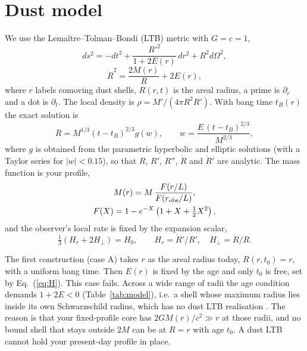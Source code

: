 \documentclass[10pt,twocolumn,letterpaper]{article}
\begin{document}
\section{Dust model}
We use the Lema\^itre--Tolman--Bondi (LTB) metric \cite{Bondi1947,Bolejko2011} with $G=c=1$,
\begin{equation}\label{eq:ltb}
ds^2=-dt^2+\frac{R'^2}{1+2E(r)}\,dr^2+R^2d\Omega^2,
\end{equation}
\begin{equation}\label{eq:fried}
\dot R^2=\frac{2M(r)}{R}+2E(r),
\end{equation}
where $r$ labels comoving dust shells, $R(r,t)$ is the areal radius, a prime is $\partial_r$ and a dot is $\partial_t$. The local density is $\rho=M'/(4\pi R^2R')$. With bang time $t_B(r)$ the exact solution is
\begin{equation}\label{eq:sol}
R=M^{1/3}(t-t_B)^{2/3}g(w),\qquad w=\frac{E\,(t-t_B)^{2/3}}{M^{2/3}},
\end{equation}
where $g$ is obtained from the parametric hyperbolic and elliptic solutions (with a Taylor series for $|w|<0.15$), so that $R$, $R'$, $R''$, $\dot R$ and $\dot R'$ are analytic. The mass function is your profile,
\begin{equation}\label{eq:M}
\begin{gathered}
M(r)=M\,\frac{F(r/L)}{F(r_{\rm obs}/L)},\\ F(X)=1-e^{-X}\left(1+X+\tfrac12X^2\right),
\end{gathered}
\end{equation}
and the observer's local rate is fixed by the expansion scalar,
\begin{equation}\label{eq:H}
\tfrac13\left(H_r+2H_\perp\right)=H_0,\qquad H_r=\dot R'/R',\quad H_\perp=\dot R/R.
\end{equation}

The first construction (case A) takes $r$ as the areal radius today, $R(r,t_0)=r$, with a uniform bang time. Then $E(r)$ is fixed by the age and only $t_0$ is free, set by Eq.~(\ref{eq:H}). This case fails. Across a wide range of radii the age condition demands $1+2E<0$ (Table~\ref{tab:model}), i.e.\ a shell whose maximum radius lies inside its own Schwarzschild radius, which has no dust LTB realisation \cite{Hellaby1985}. The reason is that your fixed-profile core has $2GM(r)/c^2\gg r$ at those radii, and no bound shell that stays outside $2M$ can be at $R=r$ with age $t_0$. A dust LTB cannot hold your present-day profile in place.
\end{document}
